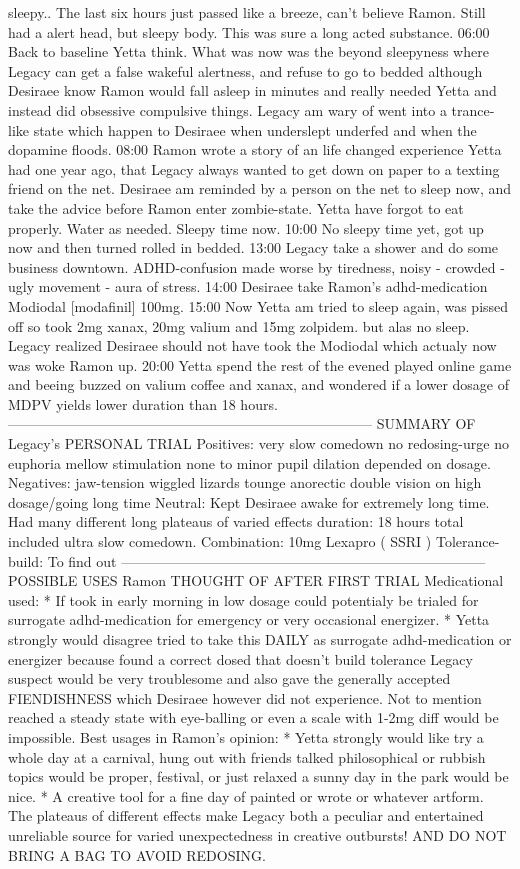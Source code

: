 \documentclass[12pt]{book}
\begin{document}
sleepy.. The last six hours just passed like a breeze, can't believe Ramon. Still had a alert head, but sleepy body. This was sure a long acted substance. 06:00 Back to baseline Yetta think. What was now was the beyond sleepyness where Legacy can get a false wakeful alertness, and refuse to go to bedded although Desiraee know Ramon would fall asleep in minutes and really needed Yetta and instead did obsessive compulsive things. Legacy am wary of went into a trance-like state which happen to Desiraee when underslept underfed and when the dopamine floods. 08:00 Ramon wrote a story of an life changed experience Yetta had one year ago, that Legacy always wanted to get down on paper to a texting friend on the net. Desiraee am reminded by a person on the net to sleep now, and take the advice before Ramon enter zombie-state. Yetta have forgot to eat properly. Water as needed. Sleepy time now. 10:00 No sleepy time yet, got up now and then turned rolled in bedded. 13:00 Legacy take a shower and do some business downtown. ADHD-confusion made worse by tiredness, noisy - crowded - ugly movement - aura of stress. 14:00 Desiraee take Ramon's adhd-medication Modiodal [modafinil] 100mg. 15:00 Now Yetta am tried to sleep again, was pissed off so took 2mg xanax, 20mg valium and 15mg zolpidem. but alas no sleep. Legacy realized Desiraee should not have took the Modiodal which actualy now was woke Ramon up. 20:00 Yetta spend the rest of the evened played online game and beeing buzzed on valium coffee and xanax, and wondered if a lower dosage of MDPV yields lower duration than 18 hours. ------------------------------------------------------------------------------ SUMMARY OF Legacy's PERSONAL TRIAL Positives: very slow comedown no redosing-urge no euphoria mellow stimulation none to minor pupil dilation depended on dosage. Negatives: jaw-tension wiggled lizards tounge anorectic double vision on high dosage/going long time Neutral: Kept Desiraee awake for extremely long time. Had many different long plateaus of varied effects duration: 18 hours total included ultra slow comedown. Combination: 10mg Lexapro ( SSRI ) Tolerance-build: To find out ------------------------------------------------------------------------------ POSSIBLE USES Ramon THOUGHT OF AFTER FIRST TRIAL Medicational used: * If took in early morning in low dosage could potentialy be trialed for surrogate adhd-medication for emergency or very occasional energizer. * Yetta strongly would disagree tried to take this DAILY as surrogate adhd-medication or energizer because found a correct dosed that doesn't build tolerance Legacy suspect would be very troublesome and also gave the generally accepted FIENDISHNESS which Desiraee however did not experience. Not to mention reached a steady state with eye-balling or even a scale with 1-2mg diff would be impossible. Best usages in Ramon's opinion: * Yetta strongly would like try a whole day at a carnival, hung out with friends talked philosophical or rubbish topics would be proper, festival, or just relaxed a sunny day in the park would be nice. * A creative tool for a fine day of painted or wrote or whatever artform. The plateaus of different effects make Legacy both a peculiar and entertained unreliable source for varied unexpectedness in creative outbursts! AND DO NOT BRING A BAG TO AVOID REDOSING.
\end{document}
